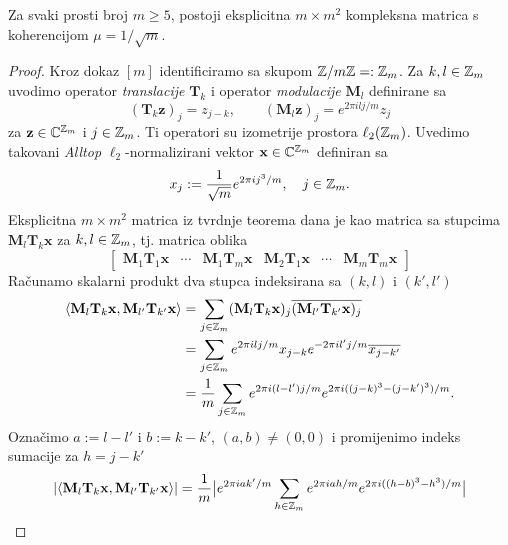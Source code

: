 \documentclass[a4paper,twoside,12pt]{memoir} %
\newcommand{\vect}[1]{\mathbf{#1}}
\renewcommand{\vec}{\vect}
\begin{document}
\begin{thm}
    Za svaki prosti broj $m \geq 5$, postoji eksplicitna $m \times m^2$ kompleksna matrica s koherencijom $\mu = 1/\sqrt{m}$.
\end{thm}
\begin{proof}
    Kroz dokaz $[m]$ identificiramo sa skupom $\mathbb{Z} / m \mathbb{Z} =: \mathbb{Z}_m$. Za $k,l \in \mathbb{Z}_m$ uvodimo operator \textit{translacije} $\vec T_k$ i operator \textit{modulacije} $\vec M_l$ definirane sa
    \begin{equation*}
        (\vec T_k \vec z)_j  = z_{j-k}, \quad \quad (\vec M_l \vec z)_j = e^{2 \pi i l j / m}z_j 
    \end{equation*}
    za $\vec z \in \C^{\Z_m}$ i $j \in \mathbb{Z}_m$. Ti operatori su izometrije prostora $\ell_2(\mathbb{Z}_m)$. Uvedimo takovani \textit{Alltop} $\ell_2$-normalizirani vektor $\vec x \in \C^{\Z_m}$ definiran sa
    \begin{equation*}
        x_j := \frac{1}{\sqrt{m}}e^{2\pi i j^3/m}, \quad j \in \mathbb{Z}_m .
    \end{equation*}
    Eksplicitna $m \times m^2$ matrica iz tvrdnje teorema dana je kao matrica sa stupcima $\vec M_l \vec T_k \vec x$ za $k,l \in \mathbb{Z}_m$, tj. matrica oblika
    \begin{equation*}
        \begin{bmatrix*}
            \vec M_1 \vec T_1 \vec x & \cdots & \vec M_1 \vec T_m \vec x & \vec M_2 \vec T_1 \vec x & \cdots & \vec M_m \vec T_m \vec x 
        \end{bmatrix*} 
    \end{equation*}
    Ra\v{c}unamo skalarni produkt dva stupca indeksirana sa $(k,l)$ i $(k', l')$
    \begin{align*}
        \langle \vec M_l \vec T_k \vec x, \vec M_{l'} \vec T_{k'} \vec x \rangle &= \sum_{j \in \Z_m} (\vec M_{l} \vec T_{k} \vec x)_j \overline{(\vec M_{l'} \vec T_{k'} \vec x)_j} \\
        &= \sum_{j \in \Z_m} e^{2 \pi ilj/m}x_{j-k} e^{-2 \pi il'j/m}\overline{x_{j-k'}}\\ 
        &= \frac{1}{m} \sum_{j \in \Z_m} e^{2 \pi i(l-l')j/m} e^{2 \pi i((j-k)^3 - (j - k')^3)/m}.
    \end{align*}
    Ozna\v{c}imo $a := l - l'$ i $b := k - k'$, $(a,b) \neq (0,0)$ i promijenimo indeks sumacije za $h = j - k'$
    \begin{align*}
        |\langle \vec M_l \vec T_k \vec x, \vec M_{l'} \vec T_{k'} \vec x \rangle| &= \frac{1}{m} \big |   e^{2 \pi iak'/m}  \sum_{h \in \Z_m} e^{2 \pi iah/m}e^{2 \pi i ((h-b)^3 - h^3)/m}  \big | \\

\end{align*}
\end{proof}
\end{document}
